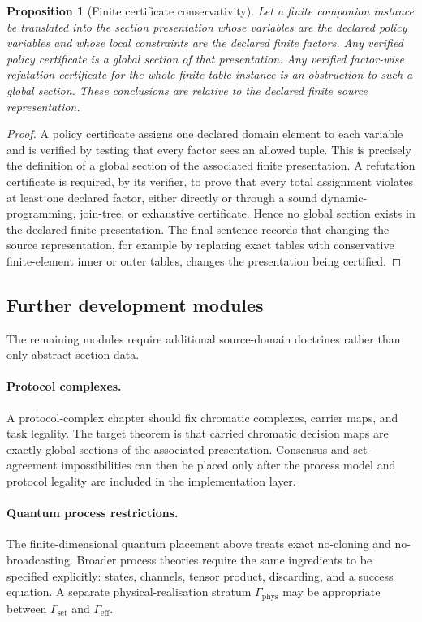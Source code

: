 \documentclass[11pt]{article}
\theoremstyle{plain}
\newtheorem{proposition}[theorem]{Proposition}
\theoremstyle{definition}
\theoremstyle{remark}
\begin{document}
\begin{proposition}[Finite certificate conservativity]
\label{prop:finite-certificate-conservativity}
Let a finite companion instance be translated into the section presentation whose
variables are the declared policy variables and whose local constraints are the
declared finite factors. Any verified policy certificate is a global section of
that presentation. Any verified factor-wise refutation certificate for the whole
finite table instance is an obstruction to such a global section. These
conclusions are relative to the declared finite source representation.
\end{proposition}

\begin{proof}
A policy certificate assigns one declared domain element to each variable and is
verified by testing that every factor sees an allowed tuple. This is precisely
the definition of a global section of the associated finite presentation. A
refutation certificate is required, by its verifier, to prove that every total
assignment violates at least one declared factor, either directly or through a
sound dynamic-programming, join-tree, or exhaustive certificate. Hence no global
section exists in the declared finite presentation. The final sentence records
that changing the source representation, for example by replacing exact tables
with conservative finite-element inner or outer tables, changes the presentation
being certified.
\end{proof}

\subsection{Further development modules}

The remaining modules require additional source-domain doctrines rather than only
abstract section data.

\paragraph{Protocol complexes.}
A protocol-complex chapter should fix chromatic complexes, carrier maps, and task
legality. The target theorem is that carried chromatic decision maps are exactly
global sections of the associated presentation. Consensus and set-agreement
impossibilities can then be placed only after the process model and protocol
legality are included in the implementation layer.

\paragraph{Quantum process restrictions.}
The finite-dimensional quantum placement above treats exact no-cloning and
no-broadcasting. Broader process theories require the same ingredients to be
specified explicitly: states, channels, tensor product, discarding, and a success
equation. A separate physical-realisation stratum
$\Gamma_{\mathrm{phys}}$ may be appropriate between $\Gamma_{\mathrm{set}}$ and
$\Gamma_{\mathrm{eff}}$.
\end{document}
